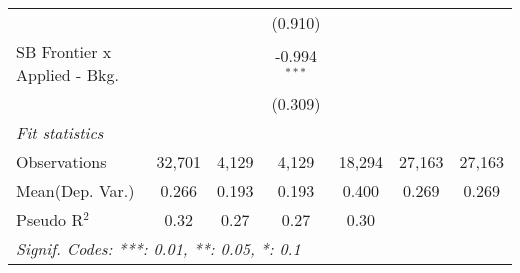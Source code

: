 \begin{tabular}{lcccccc}
                                  &                &               & (0.910)        &               &        &   \\   
   SB Frontier x Applied - Bkg.   &                &               & -0.994$^{***}$ &               &        &   \\   
                                  &                &               & (0.309)        &               &        &   \\   
   \midrule
   \emph{Fit statistics}\\
   Observations                   & 32,701         & 4,129         & 4,129          & 18,294        & 27,163 & 27,163\\  
Mean(Dep. Var.) & 0.266 & 0.193 & 0.193 & 0.400 & 0.269 & 0.269 \\
   Pseudo R$^2$                   & 0.32           & 0.27          & 0.27           & 0.30          &        & \\  
   \midrule \midrule
   \multicolumn{7}{l}{\emph{Signif. Codes: ***: 0.01, **: 0.05, *: 0.1}}\\
\end{tabular}
\par\endgroup
